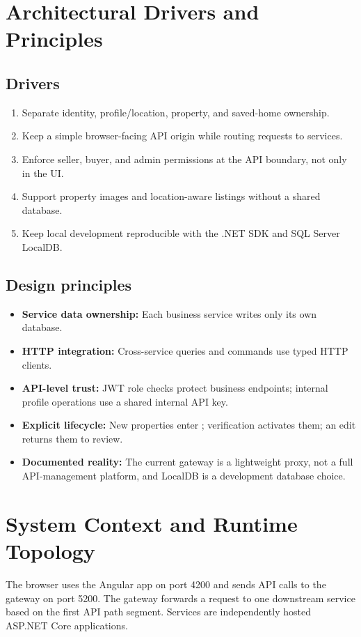 \documentclass[11pt,a4paper]{article}
\newcommand{\code}[1]{\texttt{\detokenize{#1}}}
\begin{document}
\section{Architectural Drivers and Principles}
\subsection{Drivers}
\begin{enumerate}
  \item Separate identity, profile/location, property, and saved-home ownership.
  \item Keep a simple browser-facing API origin while routing requests to services.
  \item Enforce seller, buyer, and admin permissions at the API boundary, not only in the UI.
  \item Support property images and location-aware listings without a shared database.
  \item Keep local development reproducible with the .NET SDK and SQL Server LocalDB.
\end{enumerate}

\subsection{Design principles}
\begin{itemize}
  \item \textbf{Service data ownership:} Each business service writes only its own database.
  \item \textbf{HTTP integration:} Cross-service queries and commands use typed HTTP clients.
  \item \textbf{API-level trust:} JWT role checks protect business endpoints; internal
  profile operations use a shared internal API key.
  \item \textbf{Explicit lifecycle:} New properties enter \code{Pending}; verification
  activates them; an edit returns them to review.
  \item \textbf{Documented reality:} The current gateway is a lightweight proxy, not a
  full API-management platform, and LocalDB is a development database choice.
\end{itemize}

\section{System Context and Runtime Topology}
The browser uses the Angular app on port 4200 and sends API calls to the gateway on
port 5200. The gateway forwards a request to one downstream service based on the
first API path segment. Services are independently hosted ASP.NET Core applications.
\end{document}

